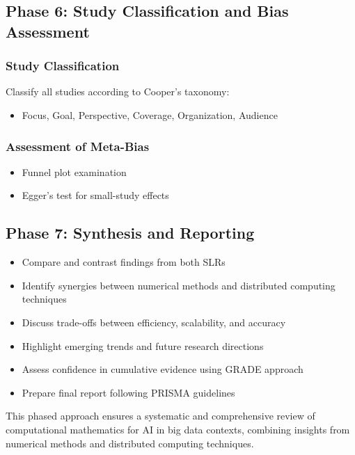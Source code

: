 \documentclass[a4paper,12pt]{article}
\begin{document}
\subsection{Phase 6: Study Classification and Bias Assessment}

\subsubsection{Study Classification}
Classify all studies according to Cooper's taxonomy:
\begin{itemize}
    \item Focus, Goal, Perspective, Coverage, Organization, Audience
\end{itemize}

\subsubsection{Assessment of Meta-Bias}
\begin{itemize}
    \item Funnel plot examination
    \item Egger's test for small-study effects
\end{itemize}

\subsection{Phase 7: Synthesis and Reporting}

\begin{itemize}
    \item Compare and contrast findings from both SLRs
    \item Identify synergies between numerical methods and distributed computing techniques
    \item Discuss trade-offs between efficiency, scalability, and accuracy
    \item Highlight emerging trends and future research directions
    \item Assess confidence in cumulative evidence using GRADE approach
    \item Prepare final report following PRISMA guidelines
\end{itemize}

This phased approach ensures a systematic and comprehensive review of computational mathematics for AI in big data contexts, combining insights from numerical methods and distributed computing techniques.



\end{document}
